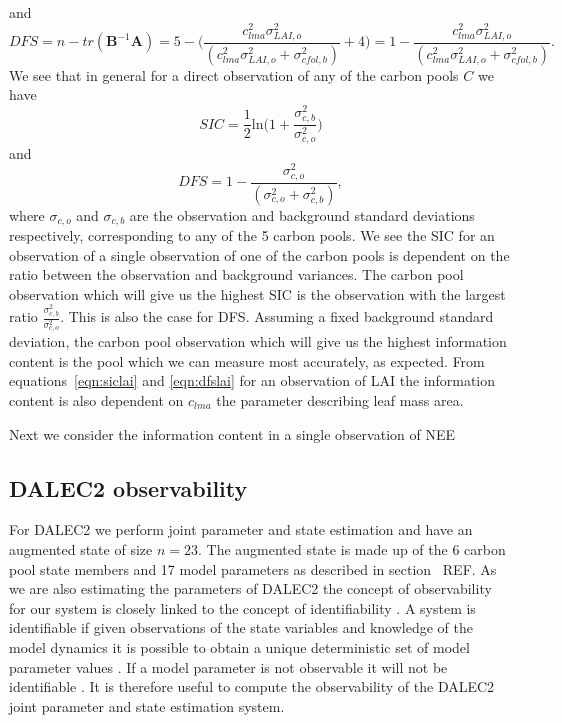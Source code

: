 \documentclass[11pt]{article}
\begin{document}
and 
\begin{equation}
DFS = n - tr(\textbf{B}^{-1}\textbf{A}) = 5 - \bigg(\frac{c_{lma}^2 \sigma_{LAI,o}^{2}}{(c_{lma}^2 \sigma_{LAI,o}^{2}+\sigma_{cfol,b}^{2})} + 4 \bigg) = 1 -\frac{c_{lma}^2 \sigma_{LAI,o}^{2}}{(c_{lma}^2 \sigma_{LAI,o}^{2}+\sigma_{cfol,b}^{2})}. \label{eqn:dfslai}
\end{equation}
We see that in general for a direct observation of any of the carbon pools $C$ we have
\begin{equation}
SIC =\frac{1}{2}\text{ln} \bigg(1+\frac{\sigma_{c,b}^{2}}{\sigma_{c,o}^{2}}\bigg)
\end{equation}
and 
\begin{equation}
DFS = 1 -\frac{\sigma_{c,o}^{2}}{(\sigma_{c,o}^{2}+\sigma_{c,b}^{2})},
\end{equation}
where $\sigma_{c,o}$ and $\sigma_{c,b}$ are the observation and background standard deviations respectively, corresponding to any of the 5 carbon pools.
We see the SIC for an observation of a single observation of one of the carbon pools is dependent on the ratio between the observation and background variances. The carbon pool observation which will give us the highest SIC is the observation with the largest ratio $\frac{\sigma_{c,b}^{2}}{\sigma_{c,o}^{2}}$. This is also the case for DFS. Assuming a fixed background standard deviation, the carbon pool observation which will give us the highest information content is the pool which we can measure most accurately, as expected. From equations~\eqref{eqn:siclai} and \eqref{eqn:dfslai} for an observation of LAI the information content is also dependent on $c_{lma}$ the parameter describing leaf mass area.

Next we consider the information content in a single observation of NEE 

\subsection{DALEC2 observability} \label{sec: D2_observability}

For DALEC2 we perform joint parameter and state estimation and have an augmented state of size $n = 23$. The augmented state is made up of the 6 carbon pool state members and 17 model parameters as described in section~{\color{red} REF}. As we are also estimating the parameters of DALEC2 the concept of observability for our system is closely linked to the concept of identifiability \citep{navon1998practical}. A system is identifiable if given observations of the state variables and knowledge of the model dynamics it is possible to obtain a unique deterministic set of model parameter values \citep{ljung1998system}. If a model parameter is not observable it will not be identifiable \citep{Jacquez1985}. It is therefore useful to compute the observability of the DALEC2 joint parameter and state estimation system.
\end{document}

